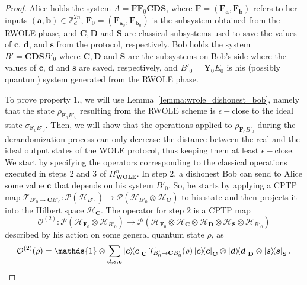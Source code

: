 \begin{proof}
Alice holds the system $A = \mathbf{F} \mathbf{F}_0 \mathbf{C} \mathbf{D} \mathbf{S}$, where $\mathbf{F} = (\mathbf{F}_{\bm{a}}, \mathbf{F}_{\bm{b}})$ refers to her inputs $(\bm{a}, \bm{b})\in \mathbb{Z}^{2n}_d$, $\mathbf{F}_0 = (\mathbf{F}_{\bm{a}_0}, \mathbf{F}_{\bm{b}_0})$ is the subsystem obtained from the RWOLE phase, and $\mathbf{C}, \mathbf{D}$ and $\mathbf{S}$ are classical subsystems used to save the values of  $\bm{c}$, $\bm{d}$, and $\bm{s}$ from the protocol, respectively.  Bob holds the system $B' = \mathbf{C} \mathbf{D} \mathbf{S} B'_0$ where $\mathbf{C}, \mathbf{D}$ and $\mathbf{S}$ are the subsystems on Bob's side where the values of $\bm{c}$, $\bm{d}$ and $\bm{s}$ are saved, respectively, and $B'_0 = \mathbf{Y}_0 E_0$ is his (possibly quantum) system generated from the RWOLE phase.

To prove property $1.$, we will use Lemma~\ref{lemma:wrole_dishonest_bob}, namely that the state $\rho_{\mathbf{F}_0 B'_0}$  resulting from the RWOLE scheme is $\epsilon-$close to the ideal state $\sigma_{\mathbf{F}_0 B'_0}$. Then, we will show that the operations applied to $\rho_{\mathbf{F}_0 B'_0}$ during the derandomization process can only decrease the distance between the real and the ideal output states of the WOLE protocol, thus keeping them at least $\epsilon-$close.
We start by specifying the operators corresponding to the classical operations executed in steps $2$ and $3$ of $\Pi^n_{\textbf{WOLE}}$. In step 2, a dishonest Bob can send to Alice some value $\bm{c}$ that depends on his system $B'_0$. So, he starts by applying a CPTP map $\mathcal{T}_{B'_0 \rightarrow \mathbf{C} B'_0}: \mathcal{P}\left( \mathcal{H}_{B'_0}\right) \rightarrow \mathcal{P}\left( \mathcal{H}_{B'_0}\otimes \mathcal{H}_{\mathbf{C}} \right)$ to his state and then projects it into the Hilbert space $\mathcal{H}_{\mathbf{C}}$. The operator for step $2$ is a CPTP map 
$$\mathcal{O}^{(2)} :  \mathcal{P}\left(\mathcal{H}_{\mathbf{F}_0} \otimes \mathcal{H}_{B'_0}\right) \rightarrow \mathcal{P}\left(\mathcal{H}_{\mathbf{F}_0} \otimes \mathcal{H}_{\mathbf{C}} \otimes \mathcal{H}_{\mathbf{D}} \otimes \mathcal{H}_{\mathbf{S}} \otimes \mathcal{H}_{B'_0}\right)$$
described by his action on some general quantum state $\rho$, as
\begin{equation*}
    \mathcal{O}^{(2)}(\rho) = \mathds{1} \otimes \sum_{\bm{d}, \bm{s}, \bm{c}} \ketbra{\bm{c}}_{\mathbf{C}} \mathcal{T}_{B'_0 \rightarrow \mathbf{C} B'_0}(\rho) \ketbra{\bm{c}}_{\mathbf{C}} \otimes \ketbra{\bm{d}}_{\mathbf{D}}\otimes\ketbra{\bm{s}}_{\mathbf{S}} .
\end{equation*}


\end{proof}
